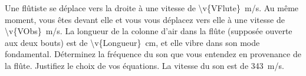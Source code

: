 Une flûtiste se déplace vers la droite à une vitesse de \qty{\v{VFlute}}{m/s}. Au même moment, vous êtes devant elle et vous vous déplacez vers elle à une vitesse de \qty{\v{VObs}}{m/s}. La longueur de la colonne d’air dans la flûte (supposée ouverte aux deux bouts) est de \qty{\v{Longueur}}{cm}, et elle vibre dans son mode fondamental. Déterminez la fréquence du son que vous entendez en provenance de la flûte. Justifiez le choix de vos équations. La vitesse du son est de \qty{343}{m/s}.
